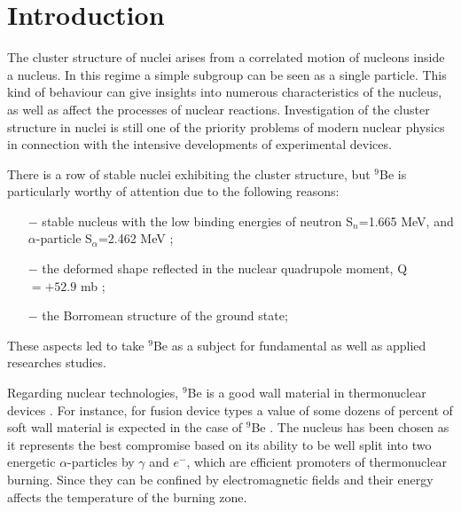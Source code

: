 \documentclass[10pt]{iopart}
\begin{document}
\section{Introduction}
The cluster structure of nuclei arises from a correlated motion of nucleons inside a nucleus. In this regime a simple subgroup can be seen as a single particle. This kind of behaviour can give insights into numerous characteristics of the nucleus, as well as affect the processes of nuclear reactions. Investigation of the cluster structure in nuclei is still one of the priority problems of modern nuclear physics in connection with the intensive developments of experimental devices.

There is a row of stable nuclei exhibiting the cluster structure, but $^9$Be is particularly worthy of attention due to the following reasons: \begin{itemize}
\item[$-$] stable nucleus with the low binding energies of neutron S$_n$=1.665 MeV, and $\alpha$-particle S$_\alpha$=2.462 MeV \cite{separationneutron};
\item[$-$] the deformed shape reflected in the nuclear quadrupole moment, Q$=+52.9 $ mb \cite{quadrupole};
\item[$-$]  the Borromean structure of the ground state;
\end{itemize}
These aspects led to take $^9$Be as a subject for fundamental  as well as applied researches  studies.

Regarding nuclear technologies, $^9$Be is a good wall material in thermonuclear devices \cite{kukulin2010, seksembayev2018}.
For instance, for fusion device types a value of some dozens of percent of soft wall material is expected in the case of $^9$Be \cite{seksembayev2018}. 
The nucleus  has been chosen as it represents the best compromise based  on its ability to be well split into two energetic $\alpha$-particles by $\gamma$ and $e^-$, which are efficient promoters of thermonuclear burning. Since they can be confined by electromagnetic fields and their energy affects the temperature of the burning zone.
\end{document}
